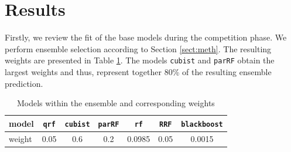 \documentclass[12pt]{article}
\begin{document}
\section{Results}
Firstly, we review the fit of the base models during the competition phase. We perform ensemble selection according to Section \ref{sect:meth}. The resulting weights are presented in Table \ref{tab:compens}. The models \texttt{cubist} and \texttt{parRF} obtain the largest weights and thus, represent together 80\% of the resulting ensemble prediction.

\begin{table}
	\centering
	\begin{tabular}{l|cccccc}
		\hline
		\hline
		model &\texttt{qrf} & \texttt{cubist} & \texttt{parRF} & \texttt{rf} & \texttt{RRF} & \texttt{blackboost} \\ \hline
		weight & 0.05 & 0.6 & 0.2 & 0.0985 & 0.05 & 0.0015\\
		\hline
		\hline
	\end{tabular}
	\caption{Models within the ensemble and corresponding weights}
	\label{tab:compens}
\end{table}
\end{document}
